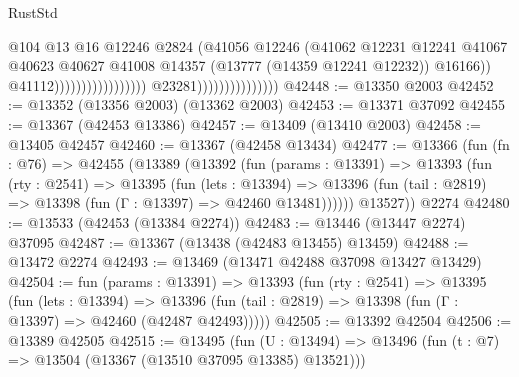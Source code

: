 \begin{lexlean}{RustStd}
\begin{coremodule}
                                                                    @104
                                                                    @13
                                                                    @16
                                                                    @12246
                                                                    @2824
                                                                    (@41056
                                                                      @12246
                                                                      (@41062
                                                                        @12231
                                                                        @12241
                                                                        @41067
                                                                        @40623
                                                                        @40627
                                                                        @41008
                                                                        @14357
                                                                        (@13777
                                                                          (@14359 @12241 @12232))
                                                                        @16166))
                                                                    @41112)))))))))))))))))
                                  @23281)))))))))))))))
@42448 := @13350 @2003
@42452 := @13352 (@13356 @2003) (@13362 @2003)
@42453 := @13371 @37092
@42455 := @13367 (@42453 @13386)
@42457 := @13409 (@13410 @2003)
@42458 := @13405 @42457
@42460 := @13367 (@42458 @13434)
@42477 := @13366
    (fun (fn : @76) =>
    @42455
      (@13389
        (@13392
          (fun (params : @13391) =>
          @13393
            (fun (rty : @2541) =>
            @13395
              (fun (lets : @13394) =>
              @13396 (fun (tail : @2819) => @13398 (fun (Γ : @13397) => @42460 @13481))))))
        @13527))
    @2274
@42480 := @13533 (@42453 (@13384 @2274))
@42483 := @13446 (@13447 @2274) @37095
@42487 := @13367 (@13438 (@42483 @13455) @13459)
@42488 := @13472 @2274
@42493 := @13469 (@13471 @42488 @37098 @13427 @13429)
@42504 := fun (params : @13391) =>
  @13393
    (fun (rty : @2541) =>
    @13395
      (fun (lets : @13394) =>
      @13396 (fun (tail : @2819) => @13398 (fun (Γ : @13397) => @42460 (@42487 @42493)))))
@42505 := @13392 @42504
@42506 := @13389 @42505
@42515 := @13495
    (fun (U : @13494) => @13496 (fun (t : @7) => @13504 (@13367 (@13510 @37095 @13385) @13521)))

\end{coremodule}
\end{lexlean}
